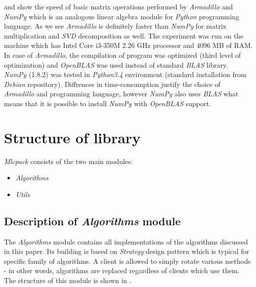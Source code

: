  and  show the speed of basic matrix operations performed by \textit{Armadillo} and \textit{NumPy} which is an analogous linear algebra module for \textit{Python} programming language. As we see \textit{Armadillo} is definitely faster than \textit{NumPy} for matrix multiplication and \textit{SVD} decomposition as well.   
The experiment was run on the machine which has Intel Core i3-350M 2.26 GHz processor and 4096 MB of RAM. In case of \textit{Armadillo}, the compilation of program was optimized (third level of optimization) and \textit{OpenBLAS} was used instead of standard \textit{BLAS} library. \textit{NumPy} (1.8.2) was tested in \textit{Python3.4} environment (standard installation from \textit{Debian} repository). Diffrences in time-consumption justify the choice of \textit{Armadillo} and  programming language, however \textit{NumPy} also uses \textit{BLAS} what means that it is possible to install \textit{NumPy} with \textit{OpenBLAS} support.

\section{Structure of library}

\textit{Mlcpack} consists of the two main modules:
\begin{itemize}
    \item \textit{Algorithms}
    \item \textit{Utils}
\end{itemize}

\subsection{Description of \textit{Algorithms} module}

The \textit{Algorithms} module contains all implementations of the algorithms discussed in this paper. Its building is based on \textit{Strategy} design pattern which is typical for specific family of algorithms. A client is allowed to simply rotate various methods - in other words, algorithms are replaced regardless of clients which use them. The structure of this module is shown in . 


